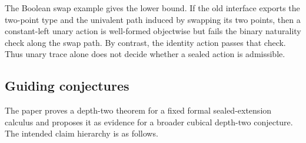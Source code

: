 \documentclass{lmcs}
\begin{document}
The Boolean swap example gives the lower bound. If the old interface exports the two-point type and the univalent path induced by swapping its two points, then a constant-left unary action is well-formed objectwise but fails the binary naturality check along the swap path. By contrast, the identity action passes that check. Thus unary trace alone does not decide whether a sealed action is admissible.

\subsection{Guiding conjectures}
\label{subsec:guiding-conjectures}

The paper proves a depth-two theorem for a fixed formal sealed-extension calculus and proposes it as evidence for a broader cubical depth-two conjecture. The intended claim hierarchy is as follows.
\end{document}
